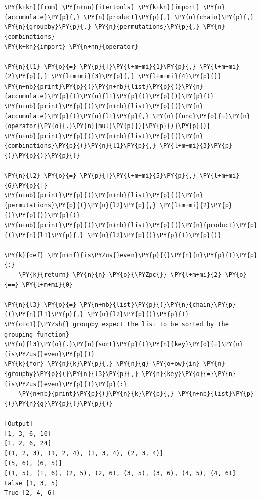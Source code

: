 \begin{Verbatim}[label=\makebox{\url{https://github.com/lucabaldini/cmepda/tree/master/slides/latex/snippets/itertools\_showcase.py}},commandchars=\\\{\}]
\PY{k+kn}{from} \PY{n+nn}{itertools} \PY{k+kn}{import} \PY{n}{accumulate}\PY{p}{,} \PY{n}{product}\PY{p}{,} \PY{n}{chain}\PY{p}{,} \PY{n}{groupby}\PY{p}{,} \PY{n}{permutations}\PY{p}{,} \PY{n}{combinations}
\PY{k+kn}{import} \PY{n+nn}{operator}

\PY{n}{l1} \PY{o}{=} \PY{p}{[}\PY{l+m+mi}{1}\PY{p}{,} \PY{l+m+mi}{2}\PY{p}{,} \PY{l+m+mi}{3}\PY{p}{,} \PY{l+m+mi}{4}\PY{p}{]}
\PY{n+nb}{print}\PY{p}{(}\PY{n+nb}{list}\PY{p}{(}\PY{n}{accumulate}\PY{p}{(}\PY{n}{l1}\PY{p}{)}\PY{p}{)}\PY{p}{)}
\PY{n+nb}{print}\PY{p}{(}\PY{n+nb}{list}\PY{p}{(}\PY{n}{accumulate}\PY{p}{(}\PY{n}{l1}\PY{p}{,} \PY{n}{func}\PY{o}{=}\PY{n}{operator}\PY{o}{.}\PY{n}{mul}\PY{p}{)}\PY{p}{)}\PY{p}{)}
\PY{n+nb}{print}\PY{p}{(}\PY{n+nb}{list}\PY{p}{(}\PY{n}{combinations}\PY{p}{(}\PY{n}{l1}\PY{p}{,} \PY{l+m+mi}{3}\PY{p}{)}\PY{p}{)}\PY{p}{)}

\PY{n}{l2} \PY{o}{=} \PY{p}{[}\PY{l+m+mi}{5}\PY{p}{,} \PY{l+m+mi}{6}\PY{p}{]}
\PY{n+nb}{print}\PY{p}{(}\PY{n+nb}{list}\PY{p}{(}\PY{n}{permutations}\PY{p}{(}\PY{n}{l2}\PY{p}{,} \PY{l+m+mi}{2}\PY{p}{)}\PY{p}{)}\PY{p}{)}
\PY{n+nb}{print}\PY{p}{(}\PY{n+nb}{list}\PY{p}{(}\PY{n}{product}\PY{p}{(}\PY{n}{l1}\PY{p}{,} \PY{n}{l2}\PY{p}{)}\PY{p}{)}\PY{p}{)}

\PY{k}{def} \PY{n+nf}{is\PYZus{}even}\PY{p}{(}\PY{n}{n}\PY{p}{)}\PY{p}{:}
    \PY{k}{return} \PY{n}{n} \PY{o}{\PYZpc{}} \PY{l+m+mi}{2} \PY{o}{==} \PY{l+m+mi}{0}

\PY{n}{l3} \PY{o}{=} \PY{n+nb}{list}\PY{p}{(}\PY{n}{chain}\PY{p}{(}\PY{n}{l1}\PY{p}{,} \PY{n}{l2}\PY{p}{)}\PY{p}{)}
\PY{c+c1}{\PYZsh{} groupby expect the list to be sorted by the grouping function}
\PY{n}{l3}\PY{o}{.}\PY{n}{sort}\PY{p}{(}\PY{n}{key}\PY{o}{=}\PY{n}{is\PYZus{}even}\PY{p}{)}
\PY{k}{for} \PY{n}{k}\PY{p}{,} \PY{n}{g} \PY{o+ow}{in} \PY{n}{groupby}\PY{p}{(}\PY{n}{l3}\PY{p}{,} \PY{n}{key}\PY{o}{=}\PY{n}{is\PYZus{}even}\PY{p}{)}\PY{p}{:}
    \PY{n+nb}{print}\PY{p}{(}\PY{n}{k}\PY{p}{,} \PY{n+nb}{list}\PY{p}{(}\PY{n}{g}\PY{p}{)}\PY{p}{)}

[Output]
[1, 3, 6, 10]
[1, 2, 6, 24]
[(1, 2, 3), (1, 2, 4), (1, 3, 4), (2, 3, 4)]
[(5, 6), (6, 5)]
[(1, 5), (1, 6), (2, 5), (2, 6), (3, 5), (3, 6), (4, 5), (4, 6)]
False [1, 3, 5]
True [2, 4, 6]
\end{Verbatim}